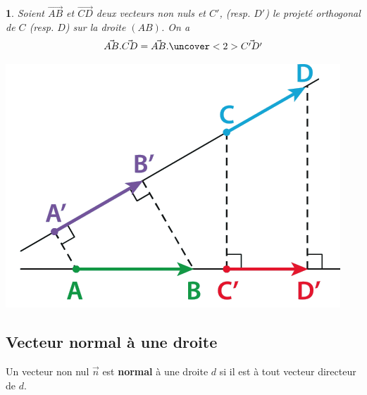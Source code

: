 \documentclass{beamer}
\newtheorem{proposition}[theorem]{\translate{Proposition}}
\theoremstyle{plain}
\begin{document}
\begin{frame}
\begin{proposition}
 Soient $\vec{AB}$ et $\vec{CD}$ deux vecteurs non nuls et $C'$, (resp. $D'$)
 le projeté orthogonal de $C$ (resp. $D$) sur la droite $(AB)$. On a 
 $$\vec{AB}.\vec{CD}=\vec{AB}.\uncover<2>{\vec{C'D'}}$$
 
   \begin{center}
    \includegraphics[scale=0.5]{../Images/projetes.png}
  \end{center}
 
 
\end{proposition}
 \end{frame}


 
 \subsection{Vecteur normal à une droite}

 \begin{frame}
 \begin{definition}
  Un vecteur non nul $\vec{n}$ est \textbf{normal} à une droite $d$ si il est 
  à tout vecteur directeur de $d$.
  
 \end{definition}
 \end{frame}
 
\end{document}
